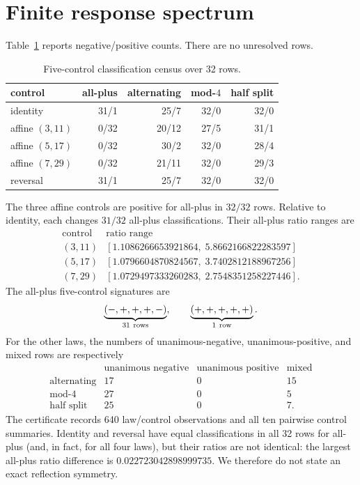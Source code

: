 \documentclass[10pt]{article}
\begin{document}
\section{Finite response spectrum}

Table~\ref{tab:census} reports negative/positive counts.  There are no
unresolved rows.

\begin{table}[ht]
\centering
\caption{Five-control classification census over 32 rows.}
\label{tab:census}
\small
\begin{tabular}{lrrrr}
\toprule
control & all-plus & alternating & mod-$4$ & half split\\
\midrule
identity & 31/1 & 25/7 & 32/0 & 32/0\\
affine $(3,11)$ & 0/32 & 20/12 & 27/5 & 31/1\\
affine $(5,17)$ & 0/32 & 30/2 & 32/0 & 28/4\\
affine $(7,29)$ & 0/32 & 21/11 & 32/0 & 29/3\\
reversal & 31/1 & 25/7 & 32/0 & 32/0\\
\bottomrule
\end{tabular}
\end{table}

The three affine controls are positive for all-plus in $32/32$ rows.
Relative to identity, each changes $31/32$ all-plus classifications.  Their
all-plus ratio ranges are
\[
\begin{array}{c|c}
\text{control} & \text{ratio range}\\ \hline
(3,11)&[1.1086266653921864,\;5.8662166822283597]\\
(5,17)&[1.0796604870824567,\;3.7402812188967256]\\
(7,29)&[1.0729497333260283,\;2.7548351258227446].
\end{array}
\]
The all-plus five-control signatures are
\[
 \underbrace{(-,+,+,+,-)}_{31\ {\rm rows}},\qquad
 \underbrace{(+,+,+,+,+)}_{1\ {\rm row}}.
\]
For the other laws, the numbers of unanimous-negative, unanimous-positive,
and mixed rows are respectively
\[
\begin{array}{c|rrr}
 & \text{unanimous negative}&\text{unanimous positive}&\text{mixed}\\ \hline
\text{alternating}&17&0&15\\
\text{mod-4}&27&0&5\\
\text{half split}&25&0&7.
\end{array}
\]
The certificate records 640 law/control observations and all ten pairwise
control summaries.  Identity and reversal have equal classifications in all
32 rows for all-plus (and, in fact, for all four laws), but their ratios are
not identical: the largest all-plus ratio difference is
$0.022723042898999735$.  We therefore do not state an exact reflection
symmetry.
\end{document}
